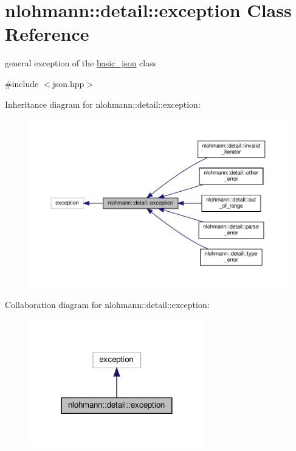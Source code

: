 \hypertarget{classnlohmann_1_1detail_1_1exception}{}\section{nlohmann\+:\+:detail\+:\+:exception Class Reference}
\label{classnlohmann_1_1detail_1_1exception}


general exception of the \hyperlink{classnlohmann_1_1basic__json}{basic\+\_\+json} class  




{\ttfamily \#include $<$json.\+hpp$>$}



Inheritance diagram for nlohmann\+:\+:detail\+:\+:exception\+:
\nopagebreak
\begin{figure}[H]
\begin{center}
\leavevmode
\includegraphics[width=350pt]{classnlohmann_1_1detail_1_1exception__inherit__graph}
\end{center}
\end{figure}


Collaboration diagram for nlohmann\+:\+:detail\+:\+:exception\+:
\nopagebreak
\begin{figure}[H]
\begin{center}
\leavevmode
\includegraphics[width=216pt]{classnlohmann_1_1detail_1_1exception__coll__graph}
\end{center}
\end{figure}
